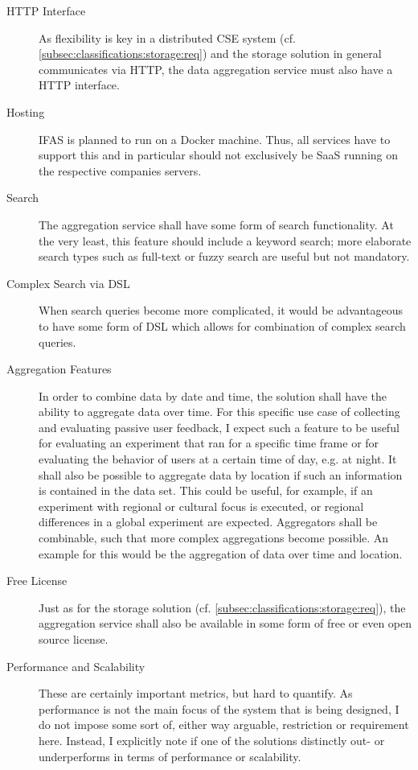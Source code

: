 \begin{description}
\item [HTTP Interface]
As flexibility is key in a distributed \ac{CSE} system (cf. \cref{subsec:classifications:storage:req}) and the storage solution in general communicates via HTTP, the data aggregation service must also have a HTTP interface.
\item [Hosting]
\ac{IFAS} is planned to run on a Docker machine.
Thus, all services have to support this and in particular should not exclusively be \ac{SaaS} running on the respective companies servers.
\item [Search]
The aggregation service shall have some form of search functionality.
At the very least, this feature should include a keyword search; more elaborate search types such as full-text or fuzzy search are useful but not mandatory.
\item [Complex Search via DSL]
When search queries become more complicated, it would be advantageous to have some form of \ac{DSL} which allows for combination of complex search queries.
\item [Aggregation Features]
In order to combine data by date and time, the solution shall have the ability to aggregate data over time.
For this specific use case of collecting and evaluating passive user feedback, I expect such a feature to be useful for evaluating an experiment that ran for a specific time frame or for evaluating the behavior of users at a certain time of day, e.g. at night.
It shall also be possible to aggregate data by location if such an information is contained in the data set.
This could be useful, for example, if an experiment with regional or cultural focus is executed, or regional differences in a global experiment are expected.
Aggregators shall be combinable, such that more complex aggregations become possible.
An example for this would be the aggregation of data over time and location.
\item [Free License]
Just as for the storage solution (cf. \cref{subsec:classifications:storage:req}), the aggregation service shall also be available in some form of free or even open source license.
\item [Performance and Scalability]
These are certainly important metrics, but hard to quantify.
As performance is not the main focus of the system that is being designed, I do not impose some sort of, either way arguable, restriction or requirement here.
Instead, I explicitly note if one of the solutions distinctly out- or underperforms in terms of performance or scalability.
\end{description}

